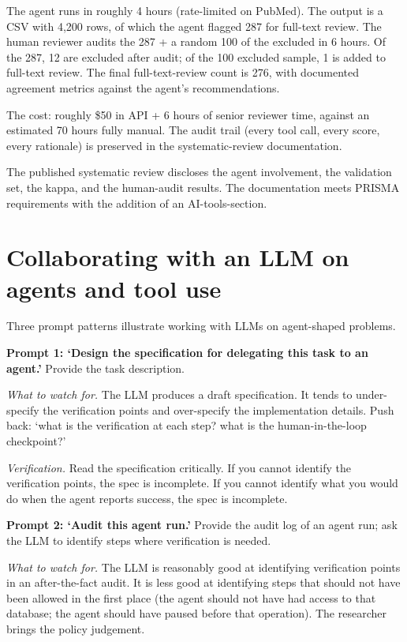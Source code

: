 \documentclass[
  letterpaper,
  11pt]{scrbook}
\begin{document}
The agent runs in roughly 4 hours (rate-limited on PubMed). The output
is a CSV with 4,200 rows, of which the agent flagged 287 for full-text
review. The human reviewer audits the 287 + a random 100 of the excluded
in 6 hours. Of the 287, 12 are excluded after audit; of the 100 excluded
sample, 1 is added to full-text review. The final full-text-review count
is 276, with documented agreement metrics against the agent's
recommendations.

The cost: roughly \$50 in API + 6 hours of senior reviewer time, against
an estimated 70 hours fully manual. The audit trail (every tool call,
every score, every rationale) is preserved in the systematic-review
documentation.

The published systematic review discloses the agent involvement, the
validation set, the kappa, and the human-audit results. The
documentation meets PRISMA requirements with the addition of an
AI-tools-section.

\section{Collaborating with an LLM on agents and tool
use}\label{collaborating-with-an-llm-on-agents-and-tool-use}

Three prompt patterns illustrate working with LLMs on agent-shaped
problems.

\textbf{Prompt 1: `Design the specification for delegating this task to
an agent.'} Provide the task description.

\emph{What to watch for.} The LLM produces a draft specification. It
tends to under-specify the verification points and over-specify the
implementation details. Push back: `what is the verification at each
step? what is the human-in-the-loop checkpoint?'

\emph{Verification.} Read the specification critically. If you cannot
identify the verification points, the spec is incomplete. If you cannot
identify what you would do when the agent reports success, the spec is
incomplete.

\textbf{Prompt 2: `Audit this agent run.'} Provide the audit log of an
agent run; ask the LLM to identify steps where verification is needed.

\emph{What to watch for.} The LLM is reasonably good at identifying
verification points in an after-the-fact audit. It is less good at
identifying steps that should not have been allowed in the first place
(the agent should not have had access to that database; the agent should
have paused before that operation). The researcher brings the policy
judgement.
\end{document}
